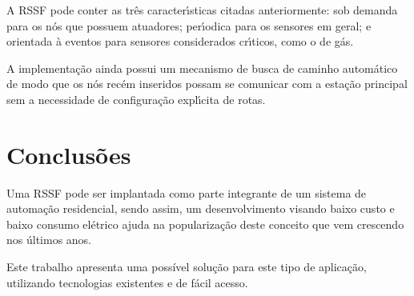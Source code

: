 \documentclass[a4,11pt]{report}
\begin{document}
A RSSF pode conter as três caracterı́sticas citadas anteriormente: sob demanda para os nós que possuem
atuadores; perı́odica para os sensores em geral; e orientada à eventos para sensores considerados crı́ticos,
como o de gás.

A implementação ainda possui um mecanismo de busca de caminho automático de modo que os nós recém inseridos
possam se comunicar com a estação principal sem a necessidade de configuração explı́cita de rotas.

\section{Conclusões}
Uma RSSF pode ser implantada como parte integrante de um sistema de automação residencial, sendo assim, um
desenvolvimento visando baixo custo e baixo consumo elétrico ajuda na popularização deste conceito que vem
crescendo nos últimos anos.

Este trabalho apresenta uma possível solução para este tipo de aplicação, utilizando tecnologias existentes e
de fácil acesso.



\end{document}
